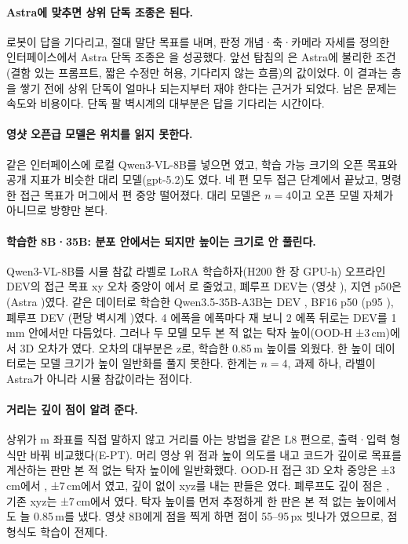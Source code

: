 \paragraph{Astra에 맞추면 상위 단독 조종은 된다.} 로봇이 답을 기다리고, 절대 말단 목표를 내며, 판정 개념·축·카메라 자세를 정의한 인터페이스에서 Astra 단독 조종은 을 성공했다. 앞선 탐침의 은 Astra에 불리한 조건(결함 있는 프롬프트, 짧은 수정만 허용, 기다리지 않는 흐름)의 값이었다. 이 결과는 층을 쌓기 전에 상위 단독이 얼마나 되는지부터 재야 한다는 근거가 되었다. 남은 문제는 속도와 비용이다. 단독 팔 벽시계의 대부분은 답을 기다리는 시간이다.

\paragraph{영샷 오픈급 모델은 위치를 읽지 못한다.} 같은 인터페이스에 로컬 Qwen3-VL-8B를 넣으면 였고, 학습 가능 크기의 오픈 목표와 공개 지표가 비슷한 대리 모델(gpt-5.2)도 였다. 네 편 모두 접근 단계에서 끝났고, 명령한 접근 목표가 머그에서 편 중앙  떨어졌다. 대리 모델은 $n=4$이고 오픈 모델 자체가 아니므로 방향만 본다.

\paragraph{학습한 8B·35B: 분포 안에서는 되지만 높이는 크기로 안 풀린다.} Qwen3-VL-8B를 시뮬 참값 라벨로 LoRA 학습하자(H200 한 장  GPU-h) 오프라인 DEV의 접근 목표 xy 오차 중앙이 에서 로 줄었고, 폐루프 DEV는 (영샷 ), 지연 p50은 (Astra )였다. 같은 데이터로 학습한 Qwen3.5-35B-A3B는 DEV , BF16 p50 (p95 ), 폐루프 DEV (편당 벽시계 )였다. 4 에폭을 에폭마다 재 보니 2 에폭 뒤로는 DEV를 1\,mm 안에서만 다듬었다. 그러나 두 모델 모두 본 적 없는 탁자 높이(OOD-H ±3\,cm)에서 3D 오차가 였다. 오차의 대부분은 z로, 학습한 0.85\,m 높이를 외웠다. 한 높이 데이터로는 모델 크기가 높이 일반화를 풀지 못한다. 한계는 $n=4$, 과제 하나, 라벨이 Astra가 아니라 시뮬 참값이라는 점이다.

\paragraph{거리는 깊이 점이 알려 준다.} 상위가 m 좌표를 직접 말하지 않고 거리를 아는 방법을 같은 L8 편으로, 출력·입력 형식만 바꿔 비교했다(E-PT). 머리 영상 위 점과 높이 의도를 내고 코드가 깊이로 목표를 계산하는 판만 본 적 없는 탁자 높이에 일반화했다. OOD-H 접근 3D 오차 중앙은 ±3\,cm에서 , ±7\,cm에서 였고, 깊이 없이 xyz를 내는 판들은 였다. 폐루프도 깊이 점은 , 기존 xyz는 ±7\,cm에서 였다. 탁자 높이를 먼저 추정하게 한 판은 본 적 없는 높이에서도 늘 0.85\,m를 냈다. 영샷 8B에게 점을 찍게 하면 점이 55--95\,px 빗나가 였으므로, 점 형식도 학습이 전제다.

